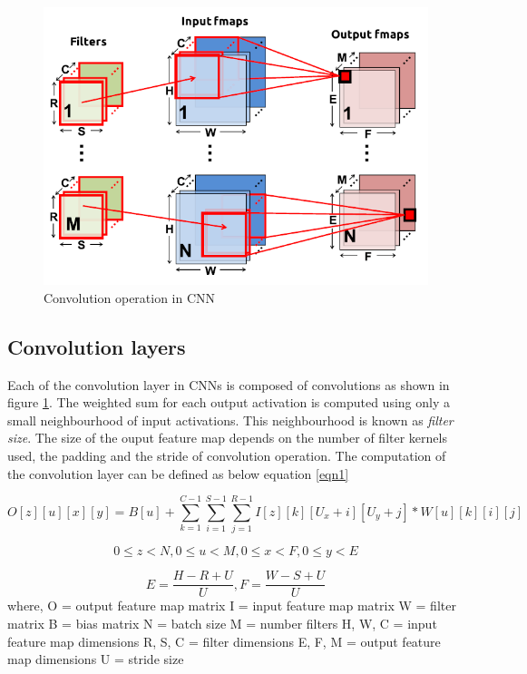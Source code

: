 \documentclass[a4paper, 12pt, oneside, BCOR1cm,toc=chapterentrywithdots]{scrbook}
\begin{document}
\begin{figure}[h]
\centering
\includegraphics[width=1\textwidth]{cnn.png}
\caption{Convolution operation in CNN \cite{sze2017efficient}}
\label{cnn}
\end{figure}


\subsection{Convolution layers}

Each of the convolution layer in CNNs is composed of convolutions as shown in figure \ref{cnn}. The weighted sum for each output activation is computed using only a small neighbourhood of input activations. This neighbourhood is known as \textit{filter size}. The size of the ouput feature map depends on the number of filter kernels used, the padding and the stride of convolution operation. The computation of the convolution layer can be defined as below equation \ref{eqn1} \cite{sze2017efficient}

\begin{equation} \label{eqn1}
O[z][u][x][y] = B[u] + \sum_{k=1}^{C-1}\sum_{i=1}^{S-1}\sum_{j=1}^{R-1} I[z][k][U_{x}+i][U_{y}+j] * W[u][k][i][j]
\end{equation}

\[0 \leq z < N ,0 \leq u < M,0 \leq x < F,0 \leq y < E\]

\[E = \frac{H - R + U}{U}, F = \frac{W - S + U}{U}\]  
\newline
where, 
\newline
O = output feature map matrix
\newline
I = input feature map matrix
\newline
W = filter matrix 
\newline
B = bias matrix
\newline
N = batch size
\newline
M = number filters
\newline
H, W, C = input feature map dimensions
\newline
R, S, C = filter dimensions
\newline
E, F, M = output feature map dimensions
\newline 
U = stride size
\end{document}
